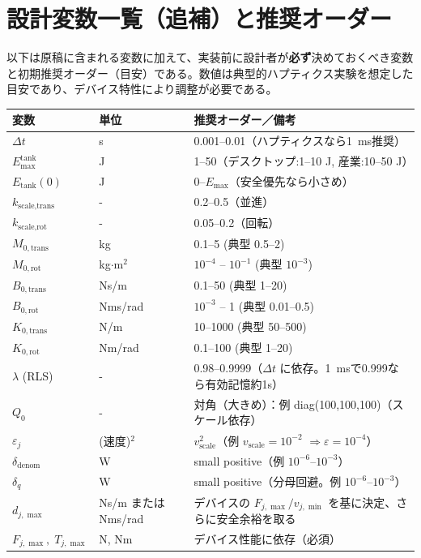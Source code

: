\documentclass[a4paper,11pt]{article}
\begin{document}
\section{設計変数一覧（追補）と推奨オーダー}
以下は原稿に含まれる変数に加えて、実装前に設計者が\textbf{必ず}決めておくべき変数と初期推奨オーダー（目安）である。数値は典型的ハプティクス実験を想定した目安であり、デバイス特性により調整が必要である。

\begin{table}[h]
\centering
\begin{tabular}{l l l}
\toprule
変数 & 単位 & 推奨オーダー／備考 \\
\midrule
$\Delta t$ & s & 0.001--0.01（ハプティクスなら1~\si{ms}推奨） \\
$E_{\max}^{\text{tank}}$ & J & 1--50（デスクトップ:1--10 J, 産業:10--50 J） \\
$E_{\text{tank}}(0)$ & J & 0--$E_{\max}$（安全優先なら小さめ） \\
$k_{\text{scale,trans}}$ & - & 0.2--0.5（並進） \\
$k_{\text{scale,rot}}$ & - & 0.05--0.2（回転） \\
$M_{0,\text{trans}}$ & kg & 0.1--5 (典型 0.5--2) \\
$M_{0,\text{rot}}$ & kg$\cdot$m$^2$ & $10^{-4}$ -- $10^{-1}$ (典型 $10^{-3}$) \\
$B_{0,\text{trans}}$ & Ns/m & 0.1--50 (典型 1--20) \\
$B_{0,\text{rot}}$ & Nms/rad & $10^{-3}$ -- 1 (典型 0.01--0.5) \\
$K_{0,\text{trans}}$ & N/m & 10--1000 (典型 50--500) \\
$K_{0,\text{rot}}$ & Nm/rad & 0.1--100 (典型 1--20) \\
$\lambda$ (RLS) & - & 0.98--0.9999（$\Delta t$ に依存。1~\si{ms}で0.999なら有効記憶約1s） \\
$Q_0$ & - & 対角（大きめ）：例 diag(100,100,100)（スケール依存） \\
$\varepsilon_j$ & (速度)$^2$ & $v_{\text{scale}}^2$（例 $v_{\text{scale}}=10^{-2}$ $\Rightarrow \varepsilon=10^{-4}$） \\
$\delta_{\text{denom}}$ & W & small positive（例 $10^{-6}$--$10^{-3}$） \\
$\delta_q$ & W & small positive（分母回避。例 $10^{-6}$--$10^{-3}$） \\
$d_{j,\max}$ & Ns/m または Nms/rad & デバイスの $F_{j,\max}/v_{j,\min}$ を基に決定、さらに安全余裕を取る \\
$F_{j,\max},\;T_{j,\max}$ & N, Nm & デバイス性能に依存（必須） \\
\bottomrule
\end{tabular}
\end{table}
\end{document}
